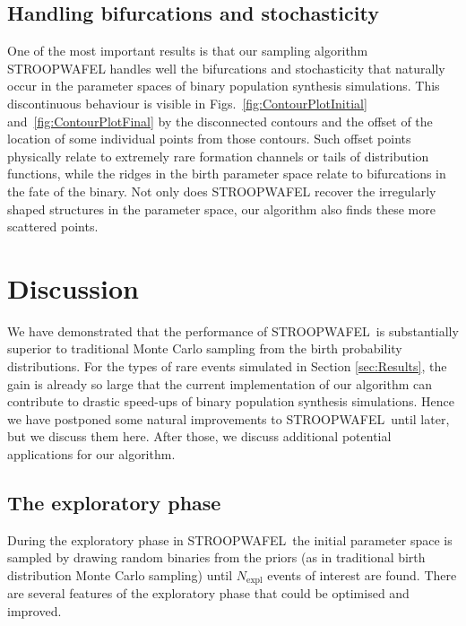 \documentclass[a4paper,fleqn,usenatbib,useAMS,usedcolumn]{mnras}
\newcommand{\AISs}{\textsc{STROOPWAFEL}}
\begin{document}
\subsection{Handling bifurcations and stochasticity}
\label{subsec:handling-bifurcations}
One of the most important results is that our sampling algorithm \AISs{} handles well the bifurcations and stochasticity that naturally occur in the parameter spaces of binary population synthesis simulations. This discontinuous behaviour is visible in Figs.~\ref{fig:ContourPlotInitial} and~\ref{fig:ContourPlotFinal} by the disconnected contours and the offset of the location of some individual points from those contours. Such offset points physically relate to extremely rare formation channels or tails of distribution functions, while the ridges in the birth parameter space relate to bifurcations in the fate of the binary.  Not only does \AISs{} recover the irregularly shaped structures in the parameter space, our algorithm also finds these more scattered points. 

\section{Discussion}
\label{sec:discussion}

We have demonstrated that the performance of \AISs \ is substantially superior to traditional Monte Carlo sampling from the birth probability distributions.    For the types of rare events simulated in Section \ref{sec:Results}, the gain is already so large that the current implementation of our algorithm can contribute to drastic speed-ups of binary population synthesis simulations.  Hence we have postponed some natural improvements to \AISs \ until later, but we discuss them here.  After those, we discuss additional potential applications for our algorithm.

\subsection{The exploratory phase}
During the exploratory phase in \AISs \ the initial parameter space is sampled by drawing random binaries from the priors (as in traditional birth distribution Monte Carlo sampling) until $N_{\text{expl}}$ events of interest are found. There are several features of the exploratory phase that could be optimised and improved. 
\end{document}
